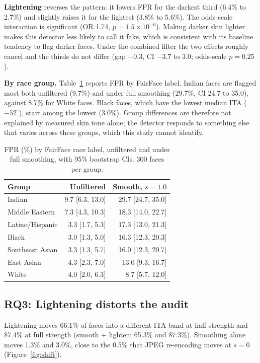 \documentclass[11pt]{article}
\begin{document}
\textbf{Lightening} reverses the pattern: it lowers FPR for the darkest third (6.4\% to 2.7\%) and slightly raises it for the lightest (3.8\% to 5.6\%). The odds-scale interaction is significant (OR 1.74, $p=1.5\times10^{-6}$). Making darker skin lighter makes this detector less likely to call it fake, which is consistent with its baseline tendency to flag darker faces. Under the combined filter the two effects roughly cancel and the thirds do not differ (gap $-0.3$, CI $-3.7$ to 3.0; odds-scale $p=0.25$).

\textbf{By race group.} Table~\ref{tab:groups} reports FPR by FairFace label. Indian faces are flagged most both unfiltered (9.7\%) and under full smoothing (29.7\%, CI 24.7 to 35.0), against 8.7\% for White faces. Black faces, which have the lowest median ITA ($-52^\circ$), start among the lowest (3.0\%). Group differences are therefore not explained by measured skin tone alone; the detector responds to something else that varies across these groups, which this study cannot identify.

\begin{table}[h]
\centering
\caption{FPR (\%) by FairFace race label, unfiltered and under full smoothing, with 95\% bootstrap CIs. 300 faces per group.}
\label{tab:groups}
\begin{tabular}{lrr}
\toprule
Group & Unfiltered & Smooth, $s=1.0$ \\
\midrule
Indian          & 9.7 [6.3, 13.0] & 29.7 [24.7, 35.0] \\
Middle Eastern  & 7.3 [4.3, 10.3] & 18.3 [14.0, 22.7] \\
Latino/Hispanic & 3.3 [1.7, 5.3]  & 17.3 [13.0, 21.3] \\
Black           & 3.0 [1.3, 5.0]  & 16.3 [12.3, 20.3] \\
Southeast Asian & 3.3 [1.3, 5.7]  & 16.0 [12.3, 20.7] \\
East Asian      & 4.3 [2.3, 7.0]  & 13.0 [9.3, 16.7] \\
White           & 4.0 [2.0, 6.3]  & 8.7 [5.7, 12.0] \\
\bottomrule
\end{tabular}
\end{table}

\subsection{RQ3: Lightening distorts the audit}
Lightening moves 66.1\% of faces into a different ITA band at half strength and 87.4\% at full strength (smooth + lighten: 65.3\% and 87.3\%). Smoothing alone moves 1.3\% and 3.0\%, close to the 0.5\% that JPEG re-encoding moves at $s=0$ (Figure~\ref{fig:shift}).
\end{document}
